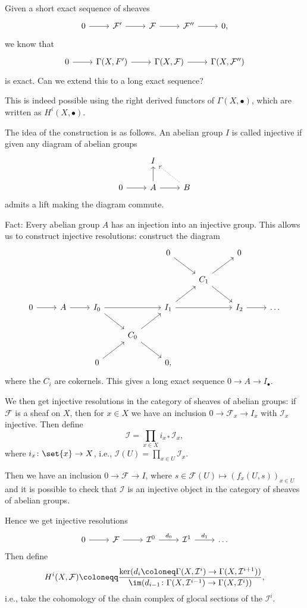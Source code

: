 Given a short exact sequence of sheaves
\[\begin{tikzcd}
0 \arrow[r] & \mathcal{F}' \arrow[r] & \mathcal{F} \arrow[r] & \mathcal{F}'' \arrow[r] & 0,
\end{tikzcd}\]
we know that
\[\begin{tikzcd}
	0\ar[r] & \Gamma(X, F')\ar[r] & \Gamma(X, \mathcal{F})\ar[r] & \Gamma(X, \mathcal{F}'')
\end{tikzcd}\]
is exact. Can we extend this to a long exact sequence?

This is indeed possible using the right derived functors of $\Gamma(X, \bullet)$, which
are written as $H^i(X, \bullet)$.

The idea of the construction is as follows. An abelian group $I$ is called injective
if given any diagram of abelian groups
\[\begin{tikzcd}
	&I\\
	0\ar[r] & A\ar[r]\ar[u] & B\ar[ul, densely dotted]
\end{tikzcd}\]
admits a lift making the diagram commute.

Fact: Every abelian group $A$ has an injection into an injective group. This allows
us to construct injective resolutions: construct the diagram
\[\begin{tikzcd}
	&&&& 0\ar[dr] && 0\\
	&&&&& C_1\ar[dr]\ar[ur]\\
	0\ar[r] & A\ar[r] & I_0\ar[rr]\ar[dr] & & I_1\ar[rr]\ar[ur] & & I_2\ar[r] & \ldots\\
	&&& C_0\ar[ur]\ar[dr]\\
	&& 0\ar[ur] && 0,
\end{tikzcd}\]
where the $C_i$ are cokernels.
This gives a long exact sequence $0\to A\to I_\bullet$.

We then get injective resolutions in the category of sheaves of abelian groups:
if $\mathcal{F}$ is a sheaf on $X$, then for $x \in X$ we have an inclusion
$0\to \mathcal{F}_x \to I_x$ with $\mathcal{I}_x$ injective. Then define
\[ \mathcal{I} = \prod_{x \in X} i_{x*}\mathcal{I}_x, \]
where $i_x\colon \set{x} \to X$, i.e., $\mathcal{I}(U) = \prod_{x \in U} \mathcal{I}_x$.

Then we have an inclusion $0\to \mathcal{F} \to I$, where $s \in \mathcal{F}(U)\mapsto (f_x(U, s))_{x \in U}$
and it is possible to check that $\mathcal{I}$ is an injective object in the category
of sheaves of abelian groups.

Hence we get injective resolutions
\[\begin{tikzcd}
	0\ar[r] & \mathcal{F}\ar[r] & \mathcal{I}^0\ar[r, "d_0"] & \mathcal{I}^1\ar[r, "d_1"] & \ldots
\end{tikzcd}\]
Then define \[H^i(X, \mathcal{F})\coloneqq \frac{\ker(d_i\coloneq \Gamma(X, \mathcal{I}^i)\to \Gamma(X, \mathcal{I}^{i+1}))}{\im(d_{i-1}\colon \Gamma(X, \mathcal{I}^{i-1})\to \Gamma(X, \mathcal{I}^i))}, \]
i.e., take the cohomology of the chain complex of glocal sections of the $\mathcal{I}^i$.

